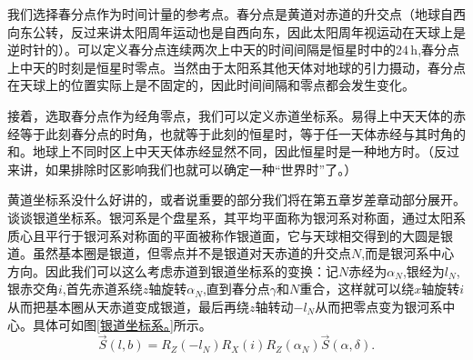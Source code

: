 \documentclass[11pt, a4paper, oneside]{ctexart}
\numberwithin{equation}{subsection}
\begin{document}
我们选择春分点作为时间计量的参考点。春分点是黄道对赤道的升交点（地球自西向东公转，反过来讲太阳周年运动也是自西向东，因此太阳周年视运动在天球上是逆时针的）。可以定义春分点连续两次上中天的时间间隔是恒星时中的$24\,\mathrm{h}$,春分点上中天的时刻是恒星时零点。当然由于太阳系其他天体对地球的引力摄动，春分点在天球上的位置实际上是不固定的，因此时间间隔和零点都会发生变化。

接着，选取春分点作为经角零点，我们可以定义赤道坐标系。易得上中天天体的赤经等于此刻春分点的时角，也就等于此刻的恒星时，等于任一天体赤经与其时角的和。地球上不同时区上中天天体赤经显然不同，因此恒星时是一种地方时。（反过来讲，如果排除时区影响我们也就可以确定一种“世界时”了。）

黄道坐标系没什么好讲的，或者说重要的部分我们将在第五章岁差章动部分展开。谈谈银道坐标系。银河系是个盘星系，其平均平面称为银河系对称面，通过太阳系质心且平行于银河系对称面的平面被称作银道面，它与天球相交得到的大圆是银道。虽然基本圈是银道，但零点并不是银道对天赤道的升交点$N$,而是银河系中心方向。因此我们可以这么考虑赤道到银道坐标系的变换：记$N$赤经为$\alpha_{N}$,银经为$l_{N}$,银赤交角$i$,首先赤道系绕$z$轴旋转$\alpha_{N}$,直到春分点$\gamma$和$N$重合，这样就可以绕$x$轴旋转$i$从而把基本圈从天赤道变成银道，最后再绕$z$轴转动$-l_{N}$从而把零点变为银河系中心。具体可如图\ref{银道坐标系。}所示。
\begin{equation}
\vec{S}\left(l,b\right)=R_{Z}\left(-l_{N}\right)R_{X}\left(i\right)R_{Z}\left(\alpha_{N}\right)\vec{S}\left(\alpha,\delta{}\right).
\end{equation}
\end{document}
